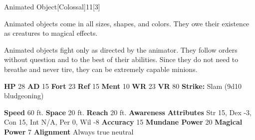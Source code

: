   \begin{monsection}{Animated Object}[Colossal]{11}[3]
    \vspace{-1em}\vspace{-1em}
    \vspace{0em}

    
    Animated objects come in all sizes, shapes, and colors. They owe their existence as creatures to magical effects.

    Animated objects fight only as directed by the animator. They follow orders without question and to the best of their abilities. Since they do not need to breathe and never tire, they can be extremely capable minions.
  
    

    \begin{spellcontent}
      \begin{spelltargetinginfo}
        \pari \textbf{HP} 28 \monsep
          \textbf{AD} 15 \monsep
          \textbf{Fort} 23 \monsep
          \textbf{Ref} 15 \monsep
          \textbf{Ment} 10
        \pari \textbf{WR} 23 \monsep
        \textbf{VR} 80
        \pari \textbf{Strike:}
            Slam  (9d10 bludgeoning)
      \end{spelltargetinginfo}
    \end{spellcontent}
    \begin{monsterfooter}
      \pari \textbf{Speed} 60 ft. \monsep
        \textbf{Space} 20 ft. \monsep
        \textbf{Reach} 20 ft.
      \pari \textbf{Awareness} 
      \pari \textbf{Attributes}
        Str 15, Dex -3,
        Con 15, Int N/A,
        Per 0, Wil -8
      \pari \textbf{Accuracy} 15 \monsep
        \textbf{Mundane Power} 20 \monsep
      \textbf{Magical Power} 7
      \pari \textbf{Alignment} Always true neutral
    \end{monsterfooter}
  \end{monsection}
  
